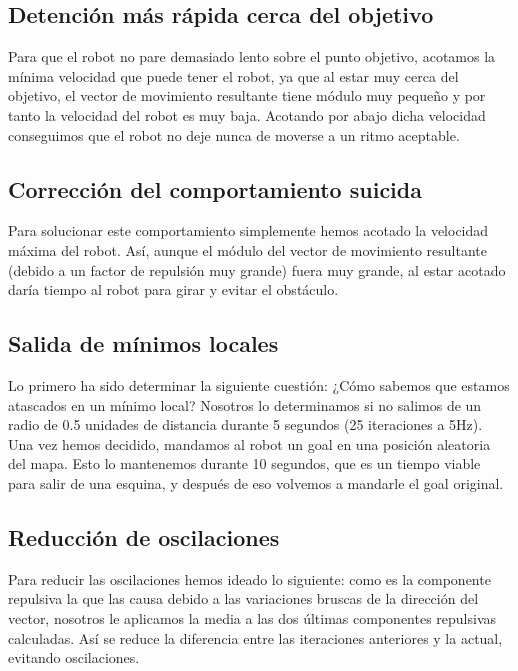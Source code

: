 \documentclass[a4paper, 11pt, titlepage]{article}
\begin{document}
  \subsection{Detención más rápida cerca del objetivo}
    Para que el robot no pare demasiado lento sobre el punto objetivo, acotamos la mínima velocidad que puede tener el robot, ya que al estar muy cerca del objetivo, el vector de movimiento resultante tiene módulo muy pequeño y por tanto la velocidad del robot es muy baja. Acotando por abajo dicha velocidad conseguimos que el robot no deje nunca de moverse a un ritmo aceptable.

  \subsection{Corrección del comportamiento suicida}
    Para solucionar este comportamiento simplemente hemos acotado la velocidad máxima del robot. Así, aunque el módulo del vector de movimiento resultante (debido a un factor de repulsión muy grande) fuera muy grande, al estar acotado daría tiempo al robot para girar y evitar el obstáculo.

  \subsection{Salida de mínimos locales}
    Lo primero ha sido determinar la siguiente cuestión: ¿Cómo sabemos que estamos atascados en un mínimo local? Nosotros lo determinamos si no salimos de un radio de 0.5 unidades de distancia durante 5 segundos (25 iteraciones a 5Hz). Una vez hemos decidido, mandamos al robot un goal en una posición aleatoria del mapa. Esto lo mantenemos durante 10 segundos, que es un tiempo viable para salir de una esquina, y después de eso volvemos a mandarle el goal original.

  \subsection{Reducción de oscilaciones}
    Para reducir las oscilaciones hemos ideado lo siguiente: como es la componente repulsiva la que las causa debido a las variaciones bruscas de la dirección del vector, nosotros le aplicamos la media a las dos últimas componentes repulsivas calculadas. Así se reduce la diferencia entre las iteraciones anteriores y la actual, evitando oscilaciones.
\end{document}
